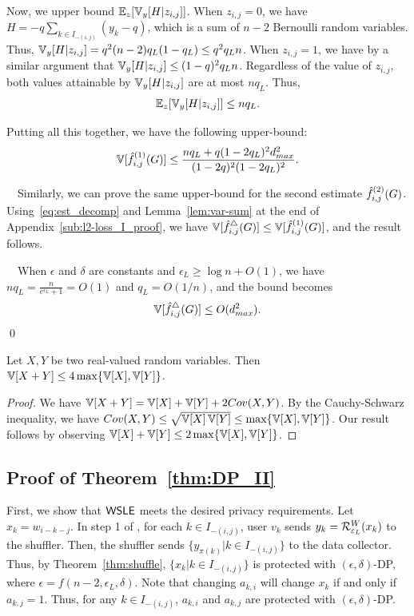 Now, we upper bound $\operatorname{\mathbb{E}}_z[\operatorname{\mathbb{V}}_y[H | z_{i,j}]]$. When $z_{i,j} = 0$, we have $H =
-q \sum_{k \in I_{-(i,j)}} (y_{k}-q)$, which is a sum of $n-2$ Bernoulli random variables.
Thus, $\operatorname{\mathbb{V}}_y[H | z_{i,j}] = q^2 (n-2) q_L(1-q_L) \leq q^2 q_L n$. When $z_{i,j} = 1$, we have
by a similar argument that $\operatorname{\mathbb{V}}_y[H | z_{i,j}] \leq (1-q)^2 q_L n$. Regardless of the value
of $z_{i,j}$, both values attainable by $\operatorname{\mathbb{V}}_y[H | z_{i,j}]$ are at most $nq_L$.
Thus,
\[
\operatorname{\mathbb{E}}_z[\operatorname{\mathbb{V}}_y[H | z_{i,j}]] \leq n q_L.
\]

Putting all this together, we have the following upper-bound:
\[
  \operatorname{\mathbb{V}}[\hat{f}_{i,j}^{(1)}(G)] \leq \frac{n q_L + q(1-2q_L)^2 d_{max}^2}{(1-2q)^2(1-2q_L)^2}.
\]

\smallskip
{}~~Similarly, we can prove the same upper-bound for the second estimate $\hat{f}_{i,j}^{(2)}(G)$.
Using~\eqref{eq:est_decomp} and Lemma~\ref{lem:var-sum} at the end of Appendix~\ref{sub:l2-loss_I_proof}, we have
$\operatorname{\mathbb{V}}[\hat{f}_{i,j}^\triangle(G)] \leq \operatorname{\mathbb{V}}[\hat{f}_{i,j}^{(1)}(G)]$, and the result follows.

\smallskip
{}~~When $\epsilon$ and $\delta$ are constants
and $\epsilon_L \geq \log n + O(1)$, we
have $nq_L = \frac{n}{e^{\epsilon_L} + 1} = O(1)$ and
$q_L = O(1/n)$,
and the bound becomes
\[
  \operatorname{\mathbb{V}}[\hat{f}_{i,j}^\triangle(G)] \leq O(d_{max}^2).
\]\qed

\begin{lemma}\label{lem:var-sum}
  Let $X,Y$ be two real-valued random variables. Then $\operatorname{\mathbb{V}}[X+Y] \leq 4\max\{\operatorname{\mathbb{V}}[X], \operatorname{\mathbb{V}}[Y]\}$.
\end{lemma}
\begin{proof}
  We have $\operatorname{\mathbb{V}}[X+Y] = \operatorname{\mathbb{V}}[X] + \operatorname{\mathbb{V}}[Y] + 2Cov(X,Y)$. By the Cauchy-Schwarz
  inequality, we have $Cov(X,Y) \leq \sqrt{\operatorname{\mathbb{V}}[X]\operatorname{\mathbb{V}}[Y]} \leq \max\{\operatorname{\mathbb{V}}[X],
  \operatorname{\mathbb{V}}[Y]\}$. Our result follows by observing $\operatorname{\mathbb{V}}[X] + \operatorname{\mathbb{V}}[Y] \leq 2\max\{\operatorname{\mathbb{V}}[X],
  \operatorname{\mathbb{V}}[Y]\}$.
\end{proof}
\subsection{Proof of Theorem~\ref{thm:DP_II}}
\label{sub:DP_II_proof}
First, we show that $\textsf{WSLE}{}$ meets the desired privacy requirements.
Let $x_k = w_{i-k-j}$. In step 1 of \AlgWSLE{},
for each $k \in I_{-(i,j)}$, user $v_k$
sends $y_k = \mathcal{R}_{\varepsilon_L}^W(x_k)$ to the shuffler.
Then, the shuffler sends $\{y_{\pi(k)} | k \in I_{-(i,j)}\}$ to the data collector.
Thus, by Theorem~\ref{thm:shuffle},
$\{x_k | k \in I_{-(i,j)}\}$
is protected with $(\epsilon, \delta)$-DP, where $\epsilon = f(n-2, \epsilon_L, \delta)$.
Note that changing $a_{k,i}$ will change $x_k$ if and only if $a_{k,j} = 1$.
Thus, for any $k \in I_{-(i,j)}$, $a_{k,i}$ and $a_{k,j}$ are protected with $(\epsilon, \delta)$-DP.

